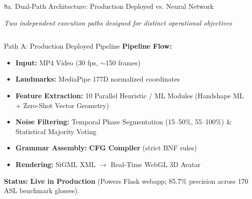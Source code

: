 \documentclass[aspectratio=169]{beamer}
\begin{document}
\begin{frame}[t]{8a. Dual-Path Architecture: Production Deployed vs. Neural Network}
\vspace{-0.1cm}
\begin{center}
    \scriptsize\textit{\textcolor{amritaMaroon}{Two independent execution paths designed for distinct operational objectives}}
\end{center}

\vspace{-1.5mm}
\begin{columns}[T]
    \begin{block}{Path A: Production Deployed Pipeline}
        \fontsize{6.8pt}{8.6pt}\selectfont
        \textbf{Pipeline Flow:}
        \begin{itemize}\setlength{\itemsep}{1.2pt}
            \item \textbf{Input:} MP4 Video (30 fps, $\sim$150 frames)
            \item \textbf{Landmarks:} MediaPipe 177D normalized coordinates
            \item \textbf{Feature Extraction:} 10 Parallel Heuristic / ML Modules (Handshape ML + Zero-Shot Vector Geometry)
            \item \textbf{Noise Filtering:} Temporal Phase Segmentation (15--50\%, 55--100\%) \& Statistical Majority Voting
            \item \textbf{Grammar Assembly:} \textbf{CFG Compiler} (strict BNF rules)
            \item \textbf{Rendering:} SiGML XML $\to$ Real-Time WebGL 3D Avatar
        \end{itemize}
        \vspace{1mm}
        \textbf{Status:} \textcolor{green!60!black}{\textbf{Live in Production}} (Powers Flask webapp; 85.7\% precision across 170 ASL benchmark glosses).
    \end{block}


\end{columns}
\end{frame}
\end{document}
